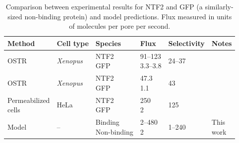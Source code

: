 
\begin{table}[b!]
  \caption[Comparison between flux measurements and model predictions.]{Comparison between experimental results for NTF2 and GFP
    (a similarly-sized non-binding protein) and model
    predictions. Flux measured in units of molecules per pore per
    second.}
    \label{table:NTF2-flux}
    \begin{tabular}{p{2.1cm}p{1.2cm}p{1.7cm}p{0.9cm}p{1.6cm}p{0.8cm}}
      Method & Cell type & Species & Flux & Selectivity & Notes\\
      \hline
      OSTR & \textit{Xenopus} & \makecell[cl]{NTF2\\GFP} & \makecell[cl]{91--123\\3.3--3.8} & 24--37 
                         &\cite{siebrasse02}
      \\
      OSTR & \textit{Xenopus} & \makecell[cl]{NTF2\\GFP} & \makecell[cl]{47.3\\1.1} & 43 &  \cite{kiskin03}\\
      \makecell[cl]{Permeabilized \\ cells}  & HeLa &
                                                    \makecell[cl]{NTF2\\GFP} & \makecell[cl]{250\\2} & 125 & \cite{ribbeck01}\\
      Model & -- & \makecell[cl]{Binding\\Non-binding} & \makecell[cl]{2--480\\2} & 1--240 & \makecell[cl]{This\\work}\\
    \end{tabular}
\end{table}

